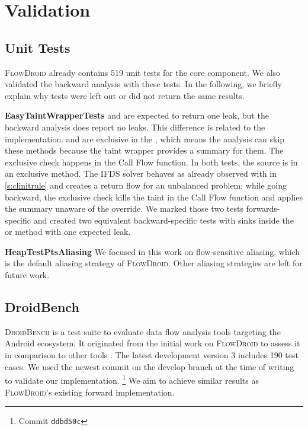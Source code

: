\documentclass[../draft.tex]{subfiles}
\begin{document}
    \chapter{Validation}
    \section{Unit Tests}
    \textsc{FlowDroid} already contains 519 unit tests for the core component.
    We also validated the backward analysis with these tests.
    In the following, we briefly explain why tests were left out or did not return the same results.

    \textbf{EasyTaintWrapperTests}
     and  are expected to return one leak, but the backward analysis does report no leaks.
    This difference is related to the  implementation.
     and  are exclusive in the , which means the analysis can skip these methods because the taint wrapper provides a summary for them.
    The exclusive check happens in the Call Flow function.
    In both tests, the source is in an exclusive method.
    The IFDS solver behaves as already observed with  in \autoref{s:clinitrule} and creates a return flow for an unbalanced problem; while going backward, the exclusive check kills the taint in the Call Flow function and applies the summary unaware of the override.
    We marked those two tests forwards-specific and created two equivalent backward-specific tests with sinks inside the  or  method with one expected leak.

    \textbf{HeapTestPtsAliasing}
    We focused in this work on flow-sensitive aliasing, which is the default aliasing strategy of \textsc{FlowDroid}.
    Other aliasing strategies are left for future work.

    \section{DroidBench}\label{s:droidbenchvalidation}
    \textsc{DroidBench} is a test suite to evaluate data flow analysis tools targeting the Android ecosystem.
    It originated from the initial work on \textsc{FlowDroid} to assess it in comparison to other tools \cite{Arzt2014}.
    The latest development version 3 includes 190 test cases\footnotemark{}.
    We used the newest commit on the develop branch at the time of writing\footnotemark{} to validate our implementation.
    \footnote{Commit \texttt{ddbd50c}}
    We aim to achieve similar results as \textsc{FlowDroid}'s existing forward implementation.
\end{document}
